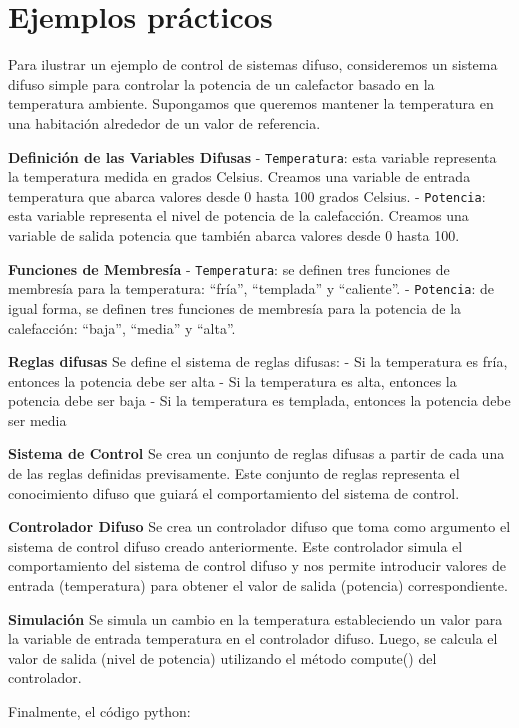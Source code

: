 \documentclass[
  a4paper,
  DIV=11,
  numbers=noendperiod]{scrreprt}
\begin{document}
\section{Ejemplos prácticos}\label{ejemplos-pruxe1cticos}

Para ilustrar un ejemplo de control de sistemas difuso, consideremos un
sistema difuso simple para controlar la potencia de un calefactor basado
en la temperatura ambiente. Supongamos que queremos mantener la
temperatura en una habitación alrededor de un valor de referencia.

\textbf{Definición de las Variables Difusas} - \texttt{Temperatura}:
esta variable representa la temperatura medida en grados Celsius.
Creamos una variable de entrada temperatura que abarca valores desde 0
hasta 100 grados Celsius. - \texttt{Potencia}: esta variable representa
el nivel de potencia de la calefacción. Creamos una variable de salida
potencia que también abarca valores desde 0 hasta 100.

\textbf{Funciones de Membresía} - \texttt{Temperatura}: se definen tres
funciones de membresía para la temperatura: ``fría'', ``templada'' y
``caliente''. - \texttt{Potencia}: de igual forma, se definen tres
funciones de membresía para la potencia de la calefacción: ``baja'',
``media'' y ``alta''.

\textbf{Reglas difusas} Se define el sistema de reglas difusas: - Si la
temperatura es fría, entonces la potencia debe ser alta - Si la
temperatura es alta, entonces la potencia debe ser baja - Si la
temperatura es templada, entonces la potencia debe ser media

\textbf{Sistema de Control} Se crea un conjunto de reglas difusas a
partir de cada una de las reglas definidas previsamente. Este conjunto
de reglas representa el conocimiento difuso que guiará el comportamiento
del sistema de control.

\textbf{Controlador Difuso} Se crea un controlador difuso que toma como
argumento el sistema de control difuso creado anteriormente. Este
controlador simula el comportamiento del sistema de control difuso y nos
permite introducir valores de entrada (temperatura) para obtener el
valor de salida (potencia) correspondiente.

\textbf{Simulación} Se simula un cambio en la temperatura estableciendo
un valor para la variable de entrada temperatura en el controlador
difuso. Luego, se calcula el valor de salida (nivel de potencia)
utilizando el método compute() del controlador.

Finalmente, el código python:
\end{document}
